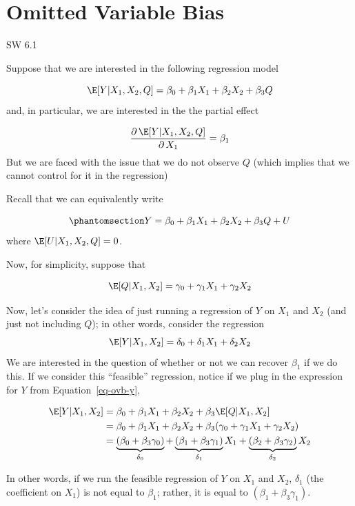 \documentclass[
  letterpaper,
  DIV=11,
  numbers=noendperiod]{scrreprt}
\begin{document}
\section{Omitted Variable Bias}\label{omitted-variable-bias}

SW 6.1

Suppose that we are interested in the following regression model

\[
  \E[Y|X_1, X_2, Q] = \beta_0 + \beta_1 X_1 + \beta_2 X_2 + \beta_3 Q
\] and, in particular, we are interested in the the partial effect

\[
  \frac{ \partial \, \E[Y|X_1,X_2,Q]}{\partial \, X_1} = \beta_1
\] But we are faced with the issue that we do not observe \(Q\) (which
implies that we cannot control for it in the regression)

Recall that we can equivalently write

\begin{equation}\phantomsection\label{eq-ovb-y}{
  Y = \beta_0 + \beta_1 X_1 + \beta_2 X_2 + \beta_3 Q + U 
}\end{equation} where \(\E[U|X_1,X_2,Q]=0\).

Now, for simplicity, suppose that

\[
  \E[Q | X_1, X_2] = \gamma_0 + \gamma_1 X_1 + \gamma_2 X_2
\]

Now, let's consider the idea of just running a regression of \(Y\) on
\(X_1\) and \(X_2\) (and just not including \(Q\)); in other words,
consider the regression \[
  \E[Y|X_1,X_2] = \delta_0 + \delta_1 X_1 + \delta_2 X_2
\] We are interested in the question of whether or not we can recover
\(\beta_1\) if we do this. If we consider this ``feasible'' regression,
notice if we plug in the expression for \(Y\) from
Equation~\ref{eq-ovb-y},

\[
  \begin{aligned}
  \E[Y|X_1,X_2] &= \beta_0 + \beta_1 X_1 + \beta_2 X_2 + \beta_3 \E[Q|X_1,X_2] \\
  &= \beta_0 + \beta_1 X_1 + \beta_2 X_2 + \beta_3 (\gamma_0 + \gamma_1 X_1 + \gamma_2 X_2) \\
  &= \underbrace{(\beta_0 + \beta_3 \gamma_0)}_{\delta_0} + \underbrace{(\beta_1 + \beta_3 \gamma_1)}_{\delta_1} X_1 + \underbrace{(\beta_2 + \beta_3 \gamma_2)}_{\delta_2} X_2
  \end{aligned}
\]

In other words, if we run the feasible regression of \(Y\) on \(X_1\)
and \(X_2\), \(\delta_1\) (the coefficient on \(X_1\)) is not equal to
\(\beta_1\); rather, it is equal to \((\beta_1 + \beta_3 \gamma_1)\).
\end{document}
